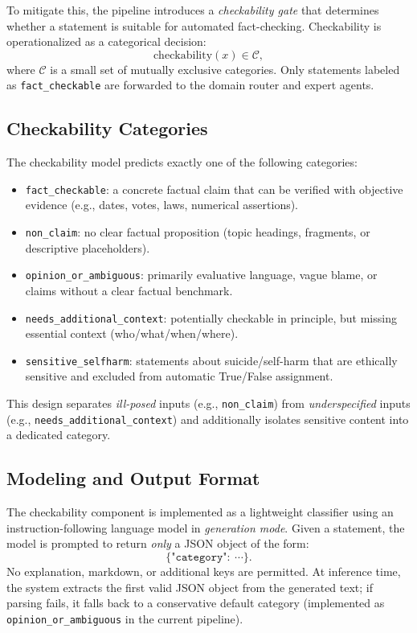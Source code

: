 To mitigate this, the pipeline introduces a \emph{checkability gate} that determines whether a statement is suitable for automated fact-checking.
Checkability is operationalized as a categorical decision:
\[
\mathrm{checkability}(x) \in \mathcal{C},
\]
where $\mathcal{C}$ is a small set of mutually exclusive categories.
Only statements labeled as \texttt{fact\_checkable} are forwarded to the domain router and expert agents.

\subsection{Checkability Categories}
The checkability model predicts exactly one of the following categories:
\begin{itemize}
    \item \texttt{fact\_checkable}: a concrete factual claim that can be verified with objective evidence (e.g., dates, votes, laws, numerical assertions).
    \item \texttt{non\_claim}: no clear factual proposition (topic headings, fragments, or descriptive placeholders).
    \item \texttt{opinion\_or\_ambiguous}: primarily evaluative language, vague blame, or claims without a clear factual benchmark.
    \item \texttt{needs\_additional\_context}: potentially checkable in principle, but missing essential context (who/what/when/where).
    \item \texttt{sensitive\_selfharm}: statements about suicide/self-harm that are ethically sensitive and excluded from automatic True/False assignment.
\end{itemize}

This design separates \emph{ill-posed} inputs (e.g., \texttt{non\_claim}) from \emph{underspecified} inputs (e.g., \texttt{needs\_additional\_context}) and additionally isolates sensitive content into a dedicated category.

\subsection{Modeling and Output Format}
The checkability component is implemented as a lightweight classifier using an instruction-following language model in \emph{generation mode}.
Given a statement, the model is prompted to return \emph{only} a JSON object of the form:
\[
\{\texttt{"category"}:\ \cdots\}.
\]
No explanation, markdown, or additional keys are permitted.
At inference time, the system extracts the first valid JSON object from the generated text; if parsing fails, it falls back to a conservative default category (implemented as \texttt{opinion\_or\_ambiguous} in the current pipeline).

